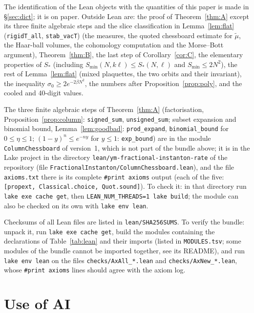 \documentclass[11pt,a4paper]{article}
\theoremstyle{definition}
\theoremstyle{remark}
\newcommand{\code}[1]{\texttt{#1}}
\begin{document}
The identification of the Lean objects with the quantities of this paper is made in \S\ref{sec:dict}; it is on paper.
Outside Lean are: the proof of Theorem~\ref{thm:A} except its three finite algebraic steps and the slice classification in Lemma~\ref{lem:flat} (\code{rigidT\_all}, \code{stab\_vacT}) (the measures, the quoted chessboard estimate for $\tilde\mu$, the Haar-ball volumes, the cohomology computation and the Morse--Bott argument), Theorem~\ref{thm:B}, the last step of Corollary~\ref{cor:C}, the elementary properties of $S_*$ (including $S_{\min}(N,k\ell)\le S_*(N,\ell)$ and $S_{\min}\le2N^2$), the rest of Lemma~\ref{lem:flat} (mixed plaquettes, the two orbits and their invariant), the inequality $\sigma_0\ge2e^{-2\beta N^2}$, the numbers after Proposition~\ref{prop:poly}, and the cooled and 40-digit values.

{\sloppy The three finite algebraic steps of Theorem~\ref{thm:A} (factorisation, Proposition~\ref{prop:column}: \code{signed\_sum}, \code{unsigned\_sum}; subset expansion and binomial bound, Lemma~\ref{lem:goodbad}: \code{prod\_expand}, \code{binomial\_bound} for $0\le\eta\le1$; $(1-y)^n\le e^{-ny}$ for $y\le1$: \code{exp\_bound}) are in the module \code{ColumnChessboard} of version~1, which is not part of the bundle above; it is in the Lake project in the directory \code{lean/\allowbreak{}ym-fractional-instanton-rate} of the repository (file \code{FractionalInstanton/\allowbreak{}ColumnChessboard.lean}), and the file \code{axioms.txt} there is its complete \code{\#print axioms} output (each of the five: \code{[propext, Classical.choice, Quot.sound]}). To check it: in that directory run \code{lake exe cache get}, then \code{LEAN\_NUM\_THREADS=1 lake build}; the module can also be checked on its own with \code{lake env lean}.\par}
Checksums of all Lean files are listed in \code{lean/SHA256SUMS}.
To verify the bundle: unpack it, run \code{lake exe cache get}, build the modules containing the declarations of Table~\ref{tab:lean} and their imports (listed in \code{MODULES.tsv}; some modules of the bundle cannot be imported together, see its README), and run \code{lake env lean} on the files \code{checks/AxAll\_*.lean} and \code{checks/AxNew\_*.lean}, whose \code{\#print axioms} lines should agree with the axiom log.

\section{Use of AI}\label{sec:ai}
\end{document}
